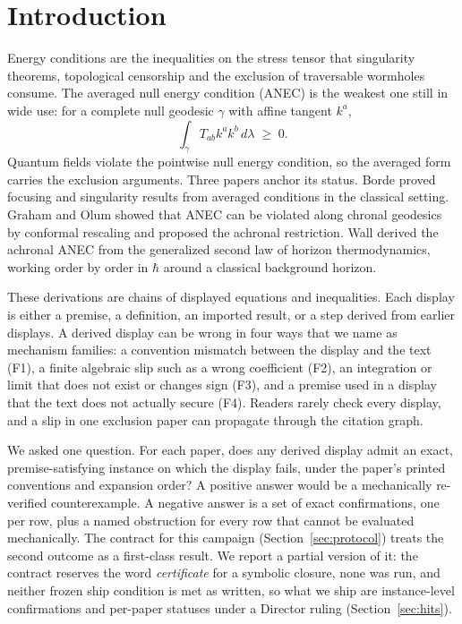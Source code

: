 \documentclass[11pt]{article}
\begin{document}
\section{Introduction}

Energy conditions are the inequalities on the stress tensor that singularity theorems, topological censorship and the exclusion of traversable wormholes consume. The averaged null energy condition (ANEC) is the weakest one still in wide use: for a complete null geodesic $\gamma$ with affine tangent $k^a$,
\begin{equation}
\int_\gamma T_{ab} k^a k^b \, d\lambda \;\ge\; 0 .
\label{eq:anec}
\end{equation}
Quantum fields violate the pointwise null energy condition, so the averaged form carries the exclusion arguments. Three papers anchor its status. Borde \cite{borde1987} proved focusing and singularity results from averaged conditions in the classical setting. Graham and Olum \cite{grahamolum2007} showed that ANEC can be violated along chronal geodesics by conformal rescaling and proposed the achronal restriction. Wall \cite{wall2010} derived the achronal ANEC from the generalized second law of horizon thermodynamics, working order by order in $\hbar$ around a classical background horizon.

These derivations are chains of displayed equations and inequalities. Each display is either a premise, a definition, an imported result, or a step derived from earlier displays. A derived display can be wrong in four ways that we name as mechanism families: a convention mismatch between the display and the text (F1), a finite algebraic slip such as a wrong coefficient (F2), an integration or limit that does not exist or changes sign (F3), and a premise used in a display that the text does not actually secure (F4). Readers rarely check every display, and a slip in one exclusion paper can propagate through the citation graph.

We asked one question. For each paper, does any derived display admit an exact, premise-satisfying instance on which the display fails, under the paper's printed conventions and expansion order? A positive answer would be a mechanically re-verified counterexample. A negative answer is a set of exact confirmations, one per row, plus a named obstruction for every row that cannot be evaluated mechanically. The contract for this campaign (Section~\ref{sec:protocol}) treats the second outcome as a first-class result. We report a partial version of it: the contract reserves the word \emph{certificate} for a symbolic closure, none was run, and neither frozen ship condition is met as written, so what we ship are instance-level confirmations and per-paper statuses under a Director ruling (Section~\ref{sec:hits}).
\end{document}
